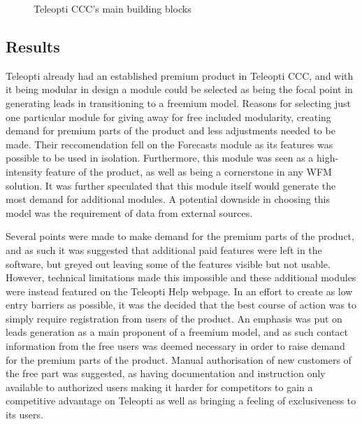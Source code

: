 \begin{figure}[H]
    \centering
    \caption{Teleopti CCC's main building blocks~\cite{teleopti2016}}
    \label{fig:teleopticcc}
\end{figure}

\subsection{Results}
Teleopti already had an established premium product in Teleopti CCC, and with it being modular in design a module could be selected as being the focal point in generating leads in transitioning to a freemium model. Reasons for selecting just one particular module for giving away for free included modularity, creating demand for premium parts of the product and less adjustments needed to be made. Their reccomendation fell on the Forecasts module as its features was possible to be used in isolation. Furthermore, this module was seen as a high-intensity feature of the product, as well as being a cornerstone in any WFM solution. It was further speculated that this module itself would generate the most demand for additional modules. A potential downside in choosing this model was the requirement of data from external sources.


Several points were made to make demand for the premium parts of the product, and as such it was suggested that additional paid features were left in the software, but greyed out leaving some of the features visible but not usable. However, technical limitations made this impossible and these additional modules were instead featured on the Teleopti Help webpage. In an effort to create as low entry barriers as possible, it was the decided that the best course of action was to simply require registration from users of the product. An emphasis was put on leads generation as a main proponent of a freemium model, and as such contact information from the free users was deemed necessary in order to raise demand for the premium parts of the product. Manual authorisation of new customers of the free part was suggested, as having documentation and instruction only available to authorized users making it harder for competitors to gain a competitive advantage on Teleopti as well as bringing a feeling of exclusiveness to its users.


